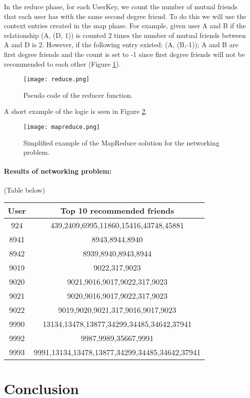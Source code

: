 \documentclass[12pt]{article}
\begin{document}
In the reduce phase, for each UserKey, we count the number of mutual friends that each user has with the same second degree friend. To do this we will use the context entries created in the map phase. For example, given user A and B if the relationship (A, (D, 1)) is counted 2 times the number of mutual friends between A and D is 2. However, if the following entry existed: (A, (B,-1)); A and B are first degree friends and the count is set to -1 since first degree friends will not be recommended to each other (Figure \ref{fig:reduce}).

\begin{figure}[h]
  \centering
  \texttt{[image: reduce.png]}
  \caption{Pseudo code of the reducer function.}
  \label{fig:reduce}
\end{figure}

A short example of the logic is seen in Figure \ref{fig:mapreduce}.

\begin{figure}[h]
  \centering
  \texttt{[image: mapreduce.png]}
  \caption{Simplified example of the MapReduce solution for the networking problem.}
  \label{fig:mapreduce}
\end{figure}

\paragraph{Results of networking problem:} (Table below)

\begin{center}
\begin{tabular}{c|c}
  User & Top 10 recommended friends\\
  \hline\hline
  924  &   439,2409,6995,11860,15416,43748,45881\\
  8941  &  8943,8944,8940\\
  8942   & 8939,8940,8943,8944\\
  9019  &  9022,317,9023\\
  9020   & 9021,9016,9017,9022,317,9023\\
  9021   & 9020,9016,9017,9022,317,9023\\
  9022   & 9019,9020,9021,317,9016,9017,9023\\
  9990   & 13134,13478,13877,34299,34485,34642,37941\\
  9992  &  9987,9989,35667,9991\\
  9993  &  9991,13134,13478,13877,34299,34485,34642,37941\\  
\end{tabular}
\end{center}
\section{Conclusion}



\begin{thebibliography}{9}
 
\end{thebibliography}
\end{document}
